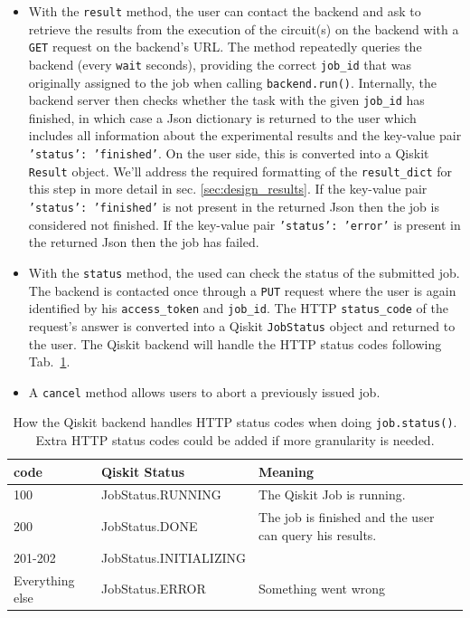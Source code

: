 \documentclass[a4paper, 10pt]{article}
\newcommand{\co}[1]{\texttt{#1}}
\begin{document}
\begin{itemize}
    \item With the \co{result} method, the user can contact the backend and ask to retrieve the results from the execution of the circuit(s) on the backend with a \co{GET} request on the backend's URL.
    The method repeatedly queries the backend (every \co{wait} seconds), providing the correct \co{job\_id} that was originally assigned to the job when calling \co{backend.run()}.
    Internally, the backend server then checks whether the task with the given \co{job\_id} has finished, in which case
    a Json dictionary is returned to the user which includes all information about the experimental results and the key-value pair \co{'status': 'finished'}.
    On the user side, this is converted into a Qiskit \co{Result} object.
    We'll address the required formatting of the \co{result\_dict} for this step in more detail in sec. \ref{sec:design_results}.
    If the key-value pair \co{'status': 'finished'} is not present in the returned Json then the job is considered not finished.
    If the key-value pair \co{'status': 'error'} is  present in the returned Json then the job has failed.
    
    \item With the \co{status} method, the used can check the status of the submitted job. 
    The backend is contacted once through a \co{PUT} request where the user is again identified by his \co{access\_token} and \co{job\_id}.
    The HTTP \co{status\_code} of the request's answer is converted into a Qiskit \co{JobStatus} object and returned to the user.
    The Qiskit backend will handle the HTTP status codes following Tab.~\ref{tab:job_status}.
    
    \item A \co{cancel} method allows users to abort a previously issued job. 
\end{itemize}

\begin{table}[]
    \centering
    \begin{tabular}{l l l} \hline
         code & Qiskit Status & Meaning \\ \hline\hline
         100 & JobStatus.RUNNING & The Qiskit Job is running. \\
         200 & JobStatus.DONE & The job is finished and the user can query his results.\\
         201-202 & JobStatus.INITIALIZING & \\
         Everything else & JobStatus.ERROR & Something went wrong \\ \hline
    \end{tabular}
    \caption{How the Qiskit backend handles HTTP status codes when doing \co{job.status()}. Extra HTTP status codes could be added if more granularity is needed.}
    \label{tab:job_status}
\end{table}
\end{document}
